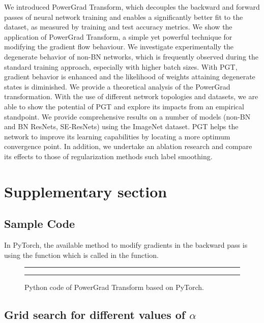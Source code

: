 \documentclass[times,sort&compress]{elsarticle}
\begin{document}
We introduced PowerGrad Transform, which decouples the backward and forward passes of
neural network training and enables a significantly better fit to the dataset, as
measured by training and test accuracy metrics. We show the application of PowerGrad
Transform, a simple yet powerful technique for modifying the gradient flow behaviour. We
investigate experimentally the degenerate behavior of non-BN networks, which is
frequently observed during the standard training approach, especially with higher batch
sizes. With PGT, gradient behavior is enhanced and the likelihood of weights attaining
degenerate states is diminished. We provide a theoretical analysis of the PowerGrad
transformation. With the use of different network topologies and datasets, we are able
to show the potential of PGT and explore its impacts from an empirical standpoint. We
provide comprehensive results on a number of models (non-BN and BN ResNets, SE-ResNets)
using the ImageNet dataset. PGT helps the network to improve its learning capabilities
by locating a more optimum convergence point. In addition, we undertake an ablation
research and compare its effects to those of regularization methods such label
smoothing.






\newpage

\section{Supplementary section}
\label{sec:Supp}




\subsection{Sample Code}

In PyTorch, the available method to modify gradients in the backward pass is using the
 function which is called in the  function.

\begin{figure}[h] \hrule  \hrule
\vspace{0.1cm} \caption{Python code of PowerGrad Transform based on PyTorch. }
\label{fig:code}
\end{figure}



\newpage \subsection{Grid search for different values of $\alpha$}
\end{document}
